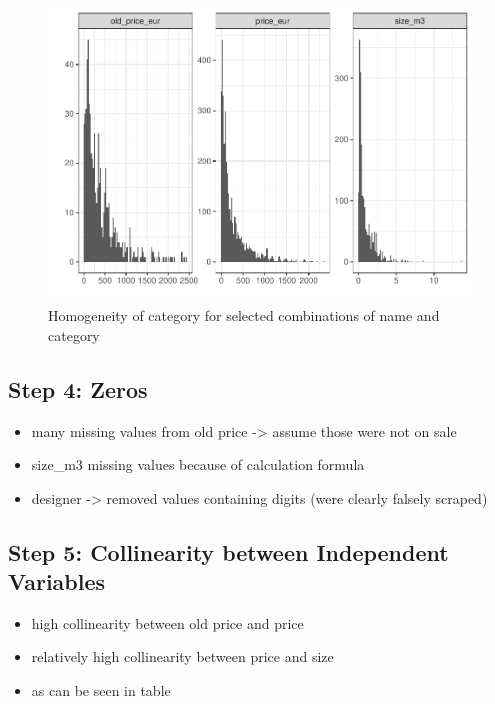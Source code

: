 \documentclass[a4paper, nobind]{templates/ociamthesis}
\providecommand{\tightlist}{%
  \setlength{\itemsep}{0pt}\setlength{\parskip}{0pt}}
\begin{document}
\begin{figure}
\includegraphics[width=1\linewidth]{_main_files/figure-latex/normality-1} \caption{Homogeneity of category for selected combinations of name and category}\label{fig:normality}
\end{figure}

\hypertarget{step-4-zeros}{%
\subsection{Step 4: Zeros}\label{step-4-zeros}}

\begin{itemize}
\tightlist
\item
  many missing values from old price -\textgreater{} assume those were not on sale
\item
  size\_m3 missing values because of calculation formula
\item
  designer -\textgreater{} removed values containing digits (were clearly falsely scraped)
\end{itemize}

\hypertarget{step-5-collinearity-between-independent-variables}{%
\subsection{Step 5: Collinearity between Independent Variables}\label{step-5-collinearity-between-independent-variables}}

\begin{itemize}
\tightlist
\item
  high collinearity between old price and price
\item
  relatively high collinearity between price and size
\item
  as can be seen in table
\end{itemize}
\end{document}
